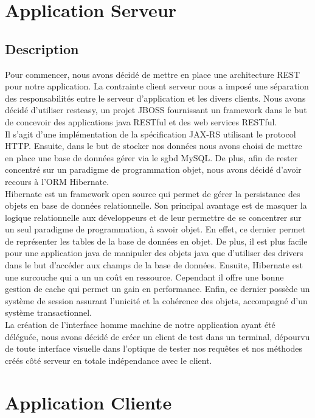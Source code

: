 \newpage
\section{Application Serveur}
\subsection{Description}
Pour commencer, nous avons décidé de mettre en place une architecture REST pour notre application. La contrainte client serveur nous a imposé
une séparation des responsabilités entre le serveur d'application et les divers clients. 
Nous avons décidé d'utiliser resteasy, un projet JBOSS fournissant un framework dans le but de concevoir des applications java RESTful et des web services RESTful.\\
Il s'agit d'une implémentation de la spécification JAX-RS utilisant le protocol HTTP.
Ensuite, dans le but de stocker nos données nous avons choisi de mettre en place une base de données gérer via le sgbd MySQL. De plus, afin de rester concentré
sur un paradigme de programmation objet, nous avons décidé d'avoir recours à l'ORM Hibernate. 
\\
Hibernate est un framework open source qui permet de gérer la persistance des objets en base de données relationnelle.
Son principal avantage est de masquer la logique relationnelle aux développeurs et de leur permettre de se concentrer
sur un seul paradigme de programmation, à savoir objet. En effet, ce dernier permet de représenter les tables de la base 
de données en objet. De plus, il est plus facile pour une application java de manipuler des objets java que d'utiliser des drivers dans le but d'accéder aux champs de la base de données. Ensuite, Hibernate est une surcouche qui a un un coût en ressource.
Cependant il offre une bonne gestion de cache qui permet un gain en performance. Enfin, ce dernier possède un système de session assurant l'unicité et la cohérence des objets, accompagné d'un système transactionnel.
\\
La création de l'interface homme machine de notre application ayant été déléguée, nous avons décidé de créer un client de test dans un terminal, dépourvu de toute interface visuelle dans l'optique de tester nos requêtes et nos méthodes créés côté serveur en totale indépendance avec le client.




\newpage
\section{Application Cliente}

